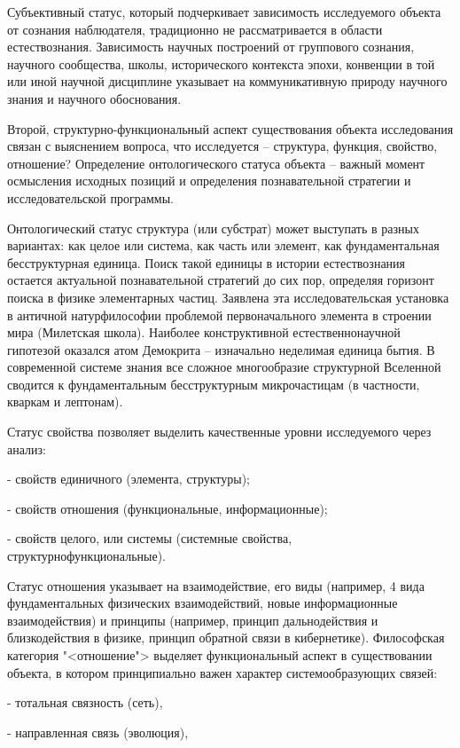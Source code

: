 \documentclass[exam_answers.tex]{subfiles}
\begin{document}
Субъективный статус, который подчеркивает зависимость исследуемого
объекта от сознания наблюдателя, традиционно не рассматривается в области
естествознания. Зависимость научных построений от группового сознания,
научного сообщества, школы, исторического контекста эпохи, конвенции в той
или иной научной дисциплине указывает на коммуникативную природу
научного знания и научного обоснования.

Второй, структурно-функциональный аспект существования объекта
исследования связан с выяснением вопроса, что исследуется – структура,
функция, свойство, отношение? Определение онтологического статуса объекта
– важный момент осмысления исходных позиций и определения
познавательной стратегии и исследовательской программы.

Онтологический статус структура (или субстрат) может выступать в
разных вариантах: как целое или система, как часть или элемент, как
фундаментальная бесструктурная единица. Поиск такой единицы в истории
естествознания остается актуальной познавательной стратегий до сих пор,
определяя горизонт поиска в физике элементарных частиц. Заявлена эта
исследовательская установка в античной натурфилософии проблемой
первоначального элемента в строении мира (Милетская школа). Наиболее
конструктивной естественнонаучной гипотезой оказался атом Демокрита –
изначально неделимая единица бытия. В современной системе знания все
сложное многообразие структурной Вселенной сводится к фундаментальным
бесструктурным микрочастицам (в частности, кваркам и лептонам).

Статус свойства позволяет выделить качественные уровни исследуемого
через анализ:

- свойств единичного (элемента, структуры);

- свойств отношения (функциональные, информационные);

- свойств целого, или системы (системные свойства, структурнофункциональные).

Статус отношения указывает на взаимодействие, его виды (например, 4
вида фундаментальных физических взаимодействий, новые информационные
взаимодействия) и принципы (например, принцип дальнодействия и
близкодействия в физике, принцип обратной связи в кибернетике).
Философская категория "<отношение"> выделяет функциональный аспект в
существовании объекта, в котором принципиально важен характер
системообразующих связей:

- тотальная связность (сеть),

- направленная связь (эволюция),
\end{document}
